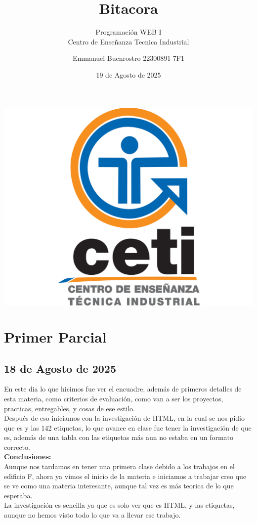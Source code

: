 \documentclass[11pt]{scrartcl}
\title {Bitacora}
\subtitle{Programación WEB I \\ Centro de Enseñanza Tecnica Industrial}
\date{19 de Agosto de 2025}
\author{Emmanuel Buenrostro 22300891 7F1}
\begin{document}
\maketitle


\begin{center}
   \includegraphics[scale=0.15]{../cetilogo.jpg} 
\end{center}
\newpage
\tableofcontents


\section{Primer Parcial}

\subsection{18 de Agosto de 2025}

En este dia lo que hicimos fue ver el encuadre, además de primeros detalles de esta materia, como criterios de evaluación, 
como van a ser los proyectos, practicas, entregables, y cosas de ese estilo.  \\

Después de eso iniciamos con la investigación de HTML, en la cual se nos pidio que es y las 142 etiquetas, lo que avance en clase fue
tener la investigación de que es, además de una tabla con las etiquetas más aun no estaba en un formato correcto. \\
 
\textbf{Conclusiones:} \\

Aunque nos tardamos en tener una primera clase debido a los trabajos en el edificio F, ahora ya vimos el inicio de la materia e iniciamos a trabajar
creo que se ve como una materia interesante, aunque tal vez es más teorica de lo que esperaba. \\
La investigación es sencilla ya que es solo ver que es HTML, y las etiquetas, aunque no hemos visto todo lo que va a llevar ese trabajo.


    
\end{document}
